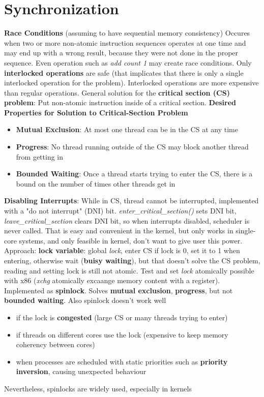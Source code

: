 \documentclass[11pt,a4paper]{article}
\begin{document}
	\section{Synchronization}
	\textbf{Race Conditions} (assuming to have sequential memory consistency) \newline
	Occures when two or more non-atomic instruction sequences operates at one time and may end up with a wrong result, because they were not done in the proper sequence. Even operation such as \textit{add count 1} may create race conditions. Only \textbf{interlocked operations} are safe (that implicates that there is only a single interlocked operation for the problem). Interlocked operations are more expensive than regular operations. \newline
	General solution for the \textbf{critical section (CS) problem}: Put non-atomic instruction inside of a critical section. \newline
	\textbf{Desired Properties for Solution to Critical-Section Problem}
	\begin{itemize}
		\item \textbf{Mutual Exclusion}: At most one thread can be in the CS at any time
		\item \textbf{Progress}: No thread running outside of the CS may block another thread from getting in
		\item \textbf{Bounded Waiting}: Once a thread starts trying to enter the CS, there is a bound on the number of times other threads get in
	\end{itemize}
	\textbf{Disabling Interrupts}: While in CS, thread cannot be interrupted, implemented with a "do not interrupt" (DNI) bit. \textit{enter\_critical\_section()} sets DNI bit, \textit{leave\_critical\_section} clears DNI bit, so when interrupts disabled, scheduler is never called. That is easy and convenient in the kernel, but only works in single-core systems, and only feasible in kernel, don't want to give user this power. \newline
	Approach: \textbf{lock variable}: global \textit{lock}, enter CS if lock is 0, set it to 1 when entering, otherwise wait (\textbf{buisy waiting}), but that doesn't solve the CS problem, reading and setting lock is still not atomic. \newline
	Test and set \textit{lock} atomically possible with x86 (\textit{xchg} atomically excaange memory content with a register). Implemented as \textbf{spinlock}. Solves \textbf{mutual exclusion}, \textbf{progress}, but not \textbf{bounded waiting}. Also spinlock doesn't work well
	\begin{itemize}
		\item if the lock is \textbf{congested} (large CS or many threads trying to enter)
		\item if threads on different cores use the lock (expensive to keep memory coherency between cores)
		\item when processes are scheduled with static priorities such as \textbf{priority inversion}, causing unexpected behaviour
	\end{itemize}
	Nevertheless, spinlocks are widely used, especially in kernels \newline
	
\end{document}
